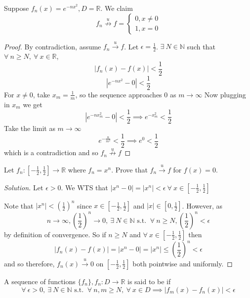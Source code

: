 \documentclass[12pt]{scrartcl}
\begin{document}
\begin{example}
  Suppose $f_n(x) = e^{-nx^2}, D = \mathbb{R}$. We claim 
  \[f_n \overset{u}{\not\longrightarrow}f = \begin{cases}
    0, x \neq 0\\
    1, x = 0
  \end{cases}\]
  \begin{proof}
    By contradiction, assume $f_n \overset{u}{\longrightarrow} f$. Let $\epsilon = \frac{1}{2}$. 
    $\exists \ N \in \mathbb{N}$ such that $\forall \ n \geq N, \ \forall \ x \in \mathbb{R}$, 
    \[|f_n(x) - f(x)| < \frac{1}{2}\]
    \[|e^{-nx^2} -0| < \frac{1}{2}\]
    For $x \neq 0$, take $x_m = \frac{1}{m}$, so the sequence approaches $0$ as $m \to \infty$
    Now plugging in $x_m$ we get 
    \[|e^{-nx_m^2} - 0| < \frac{1}{2} \implies e^{-x_m^2} < \frac{1}{2}\]
    Take the limit as $m \to \infty$
    \[e^{-\frac{n}{m^2}} < \frac{1}{2} \implies e^0 < \frac{1}{2}\]
    which is a contradiction and so $f_n \overset{u}{\not\longrightarrow} f$
  \end{proof}
\end{example}

\begin{example}
  Let $f_n: [-\frac{1}{2}, \frac{1}{2}] \to \mathbb{R}$ where $f_n = x^n$. 
  Prove that $f_n \overset{u}{\longrightarrow}f$ for $f(x) = 0$.

  \begin{proof}[Solution]
    Let $\epsilon > 0$. We WTS that $|x^n - 0| = |x^n| < \epsilon \ \forall \ x \in [-\frac{1}{2}, \frac{1}{2}]$
    
    Note that $|x^n| < (\frac{1}{2})^n$ since $x \in [-\frac{1}{2}, \frac{1}{2}]$ and $|x| \in [0, \frac{1}{2}]$. However, 
    as
    \[n\to\infty, (\frac{1}{2})^n \to 0, \ \exists \ N \in \mathbb{N} \text{ s.t. } \ \forall \ n \geq N, (\frac{1}{2})^n < \epsilon\]
    by definition of convergence. So if $n \geq N$ and $\forall \ x \in [-\frac{1}{2}, \frac{1}{2}]$ then 
    \[|f_n(x) - f(x)| = |x^n - 0| = |x^n| \leq (\frac{1}{2})^n < \epsilon\]
    and so therefore, $f_n(x) \overset{u}{\longrightarrow} 0$ on $[-\frac{1}{2}, \frac{1}{2}]$
    both pointwise and uniformly. 
  \end{proof}
\end{example}

\begin{definition}
  A sequence of functions $\{f_n\}, f_n: D \to \mathbb{R}$ is said to be 
   if 
  \[\forall \ \epsilon > 0, \ \exists \ N \in \mathbb{N} \text{ s.t. } \ \forall \ n, m \geq N, \ \forall \ x \in D \implies |f_m(x) - f_n(x)| < \epsilon\]
\end{definition}
\end{document}
